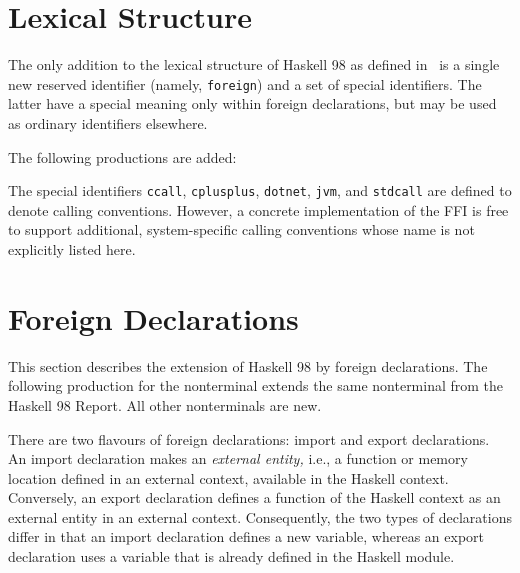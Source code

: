 \documentclass[a4paper,twoside]{article}
\newcommand{\code}[1]{\texttt{#1}}      %
\begin{document}
\newpage
\section{Lexical Structure}

The only addition to the lexical structure of Haskell 98 as defined
in~\cite[Section~2]{haskell98} is a single new reserved identifier (namely,
\code{foreign}) and a set of special identifiers.  The latter have a special
meaning only within foreign declarations, but may be used as ordinary
identifiers elsewhere.

The following productions are added:
%
\begin{grammar}
\end{grammar}
%
The special identifiers \code{ccall}, \code{cplusplus}, \code{dotnet},
\code{jvm}, and \code{stdcall} are defined to denote calling conventions.
However, a concrete implementation of the FFI is free to support additional,
system-specific calling conventions whose name is not explicitly listed here.


\newpage
\section{Foreign Declarations}

This section describes the extension of Haskell 98 by foreign declarations.
The following production for the nonterminal  extends the same
nonterminal from the Haskell 98 Report.  All other nonterminals are new.
%
\begin{grammar}
\end{grammar}
%
There are two flavours of foreign declarations: import and export
declarations.  An import declaration makes an \emph{external entity,} i.e., a
function or memory location defined in an external context, available in the
Haskell context.  Conversely, an export declaration defines a function of the
Haskell context as an external entity in an external context.  Consequently,
the two types of declarations differ in that an import declaration defines a
new variable, whereas an export declaration uses a variable that is already
defined in the Haskell module.
\end{document}
